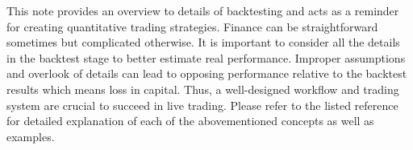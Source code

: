 \documentclass[12pt]{article}
\begin{document}
This note provides an overview to details of backtesting and acts as a reminder for creating quantitative trading strategies. Finance can be straightforward sometimes but complicated otherwise. It is important to consider all the details in the backtest stage to better estimate real performance. Improper assumptions and overlook of details can lead to opposing performance relative to the backtest results which means loss in capital. Thus, a well-designed workflow and trading system are crucial to succeed in live trading. Please refer to the listed reference for detailed explanation of each of the abovementioned concepts as well as examples.

\renewcommand{\refname}{Reference}
\printbibliography
\end{document}
